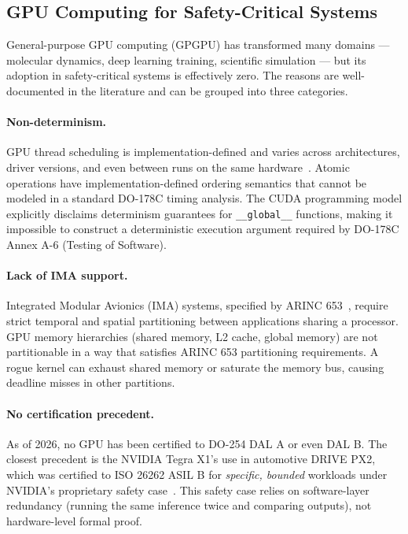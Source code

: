 \documentclass[sigplan,review,anonymous]{acmart}
\begin{document}
\subsection{GPU Computing for Safety-Critical Systems}
\label{sec:related-gpu}

General-purpose GPU computing (GPGPU) has transformed many domains —
molecular dynamics, deep learning training, scientific simulation — but
its adoption in safety-critical systems is effectively zero. The reasons
are well-documented in the literature and can be grouped into three
categories.

\paragraph{Non-determinism.}
GPU thread scheduling is implementation-defined and varies across
architectures, driver versions, and even between runs on the same
hardware~\cite{betts2011 gpu_verify}. Atomic operations have
implementation-defined ordering semantics that cannot be modeled in a
standard DO-178C timing analysis. The CUDA programming model explicitly
disclaims determinism guarantees for \texttt{\_\_global\_\_} functions,
making it impossible to construct a deterministic execution argument
required by DO-178C Annex A-6 (Testing of Software).

\paragraph{Lack of IMA support.}
Integrated Modular Avionics (IMA) systems, specified by ARINC
653~\cite{arinc653}, require strict temporal and spatial partitioning
between applications sharing a processor. GPU memory hierarchies
(shared memory, L2 cache, global memory) are not partitionable in a way
that satisfies ARINC 653 partitioning requirements. A rogue kernel can
exhaust shared memory or saturate the memory bus, causing deadline misses
in other partitions.

\paragraph{No certification precedent.}
As of 2026, no GPU has been certified to DO-254 DAL A or even DAL B.
The closest precedent is the NVIDIA Tegra X1's use in automotive
DRIVE PX2, which was certified to ISO 26262 ASIL B for \emph{specific,
bounded} workloads under NVIDIA's proprietary safety
case~\cite{nvidia2020safety}. This safety case relies on software-layer
redundancy (running the same inference twice and comparing outputs), not
hardware-level formal proof.
\end{document}
